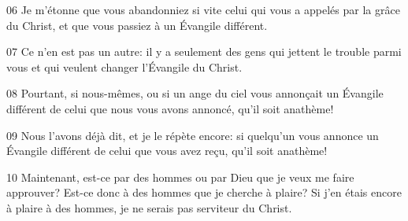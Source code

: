 
06 Je m’étonne que vous abandonniez si vite celui qui vous a appelés par la grâce du Christ, et que vous passiez à un Évangile différent.

07 Ce n'en est pas un autre: il y a seulement des gens qui jettent le trouble parmi vous et qui veulent changer l’Évangile du Christ.

08 Pourtant, si nous-mêmes, ou si un ange du ciel vous annonçait un Évangile différent de celui que nous vous avons annoncé, qu’il soit anathème!

09 Nous l’avons déjà dit, et je le répète encore: si quelqu’un vous annonce un Évangile différent de celui que vous avez reçu, qu’il soit anathème!

10 Maintenant, est-ce par des hommes ou par Dieu que je veux me faire approuver? Est-ce donc à des hommes que je cherche à plaire? Si j’en étais encore à plaire à des hommes, je ne serais pas serviteur du Christ.
